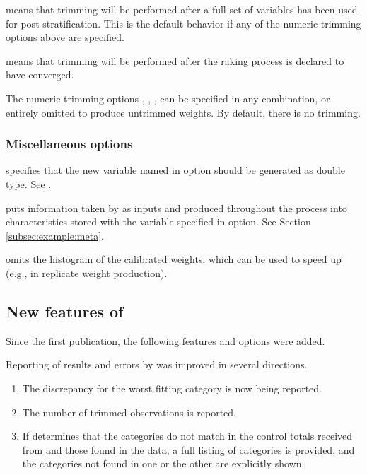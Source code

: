 \morehang {} means that trimming will be performed
    after a full set of variables has been used for post-stratification.
    This is the default behavior if any of the numeric trimming
    options above are specified.

\morehang {}
    means that trimming will be performed after the raking process
    is declared to have converged.

The numeric trimming options , ,
,  can be specified in any combination,
or entirely omitted to produce untrimmed weights. By default, there is no trimming.

\subsubsection{Miscellaneous options}

\hangpara
{} specifies that the new variable named in 
option should be generated as double type. See .

\hangpara
{} puts information taken by  as inputs and produced
    throughout the process into characteristics stored with the variable specified in
     option. See Section \ref{subsec:example:meta}.

\hangpara
{} omits the histogram of the calibrated weights, which can be
used to speed up  (e.g., in replicate weight production).

\subsection{New features of }

Since the first publication, the following features and options were added.

Reporting of results and errors by  was improved in several directions.
\begin{enumerate}
    \item The discrepancy for the worst fitting category is now being reported.
    \item The number of trimmed observations is reported.
    \item If  determines that the categories do not match
        in the control totals received from  and those found in
        the data, a full listing of categories is provided, and the categories
        not found in one or the other are explicitly shown.
\end{enumerate}

